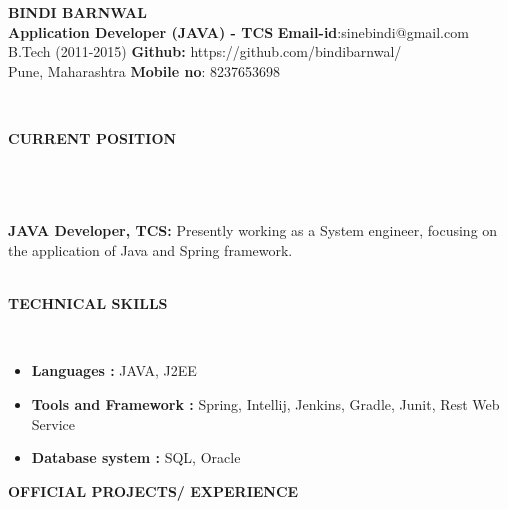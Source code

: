 \documentclass[a4paper,10pt]{article}
\newcommand{\lsep}{-0.5cm}
\newcommand{\resheading}[1]{{\small \colorbox{mygrey}{\begin{minipage}{0.975\textwidth}{\textbf{#1 \vphantom{p\^{E}}}}\end{minipage}}}}
\begin{document}
\begin{center}
\textbf{\Huge BINDI BARNWAL \\ }  
\indent \hfill \break
\indent \textbf{Application Developer (JAVA) - TCS} \hfill \textbf{Email-id}:{sinebindi@gmail.com} \\
\indent B.Tech (2011-2015)  \hfill \textbf{Github:} {https://github.com/bindibarnwal/} \\
\indent Pune, Maharashtra \hfill \textbf{Mobile no}: {8237653698} \\
\end{center}

\hspace{0.3cm}\\[-0.1cm]
\resheading{\textbf{CURRENT POSITION} }\\[\lsep] \\ \\
\textbf{JAVA Developer, TCS: } Presently working as a System engineer, focusing on the application of Java and Spring framework. \\
\hspace{0.5cm}\\[-0.2cm]
\resheading{\textbf{TECHNICAL SKILLS} }\\[\lsep]
\begin{itemize}
\item \textbf{Languages :} JAVA, J2EE
\item \textbf{Tools and Framework :} Spring, Intellij, Jenkins, Gradle, Junit, Rest Web Service 
\item \textbf{Database system :} SQL, Oracle 
\end{itemize}
\resheading{\textbf{OFFICIAL PROJECTS/ EXPERIENCE} }\\[\lsep]
\end{document}
